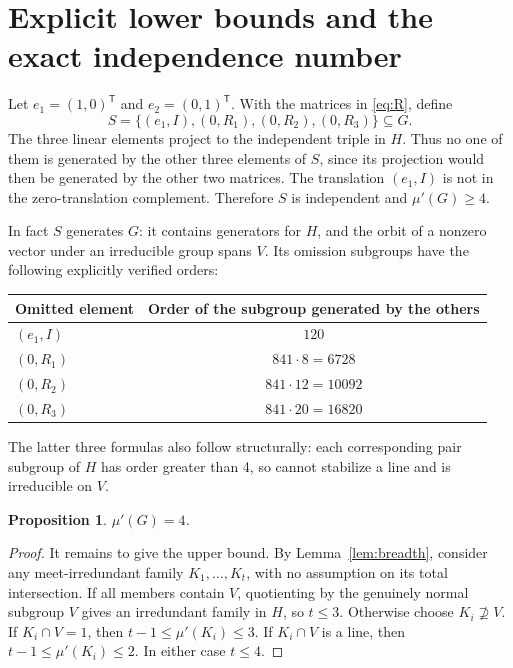 \documentclass[11pt]{article}
\newtheorem{proposition}[theorem]{Proposition}
\theoremstyle{remark}\newtheorem{remark}[theorem]{Remark}
\newcommand{\mup}{\mu'}
\begin{document}
\section{Explicit lower bounds and the exact independence number}
Let $e_1=(1,0)^\mathsf{T}$ and $e_2=(0,1)^\mathsf{T}$. With the matrices in
\eqref{eq:R}, define
\[
 S=\{(e_1,I),(0,R_1),(0,R_2),(0,R_3)\}\subseteq G.
\]
The three linear elements project to the independent triple in $H$. Thus no
one of them is generated by the other three elements of $S$, since its
projection would then be generated by the other two matrices. The translation
$(e_1,I)$ is not in the zero-translation complement. Therefore $S$ is
independent and $\mup(G)\ge4$.

In fact $S$ generates $G$: it contains generators for $H$, and the orbit of
a nonzero vector under an irreducible group spans $V$. Its omission subgroups
have the following explicitly verified orders:
\begin{center}
\begin{tabular}{lc}
\toprule
Omitted element & Order of the subgroup generated by the others\\
\midrule
$(e_1,I)$ & $120$\\
$(0,R_1)$ & $841\cdot8=6728$\\
$(0,R_2)$ & $841\cdot12=10092$\\
$(0,R_3)$ & $841\cdot20=16820$\\
\bottomrule
\end{tabular}
\end{center}
The latter three formulas also follow structurally: each corresponding pair
subgroup of $H$ has order greater than 4, so cannot stabilize a line and is
irreducible on $V$.

\begin{proposition}\label{prop:mu}
$\mup(G)=4$.
\end{proposition}
\begin{proof}
It remains to give the upper bound. By Lemma~\ref{lem:breadth}, consider any
meet-irredundant family $K_1,\ldots,K_t$, with no assumption on its total
intersection. If all members contain $V$, quotienting by the genuinely normal
subgroup $V$ gives an irredundant family in $H$, so $t\le3$.
Otherwise choose $K_i\not\supseteq V$. If $K_i\cap V=1$, then
$t-1\le\mup(K_i)\le3$. If $K_i\cap V$ is a line, then
$t-1\le\mup(K_i)\le2$. In either case $t\le4$.
\end{proof}
\end{document}

